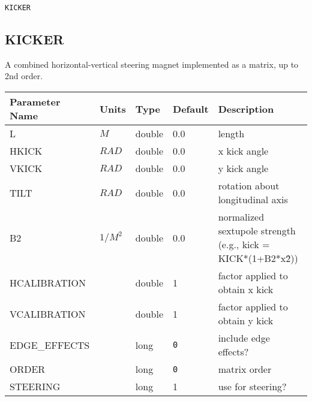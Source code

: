 \begin{latexonly}
\newpage
\begin{center}{\Large\verb|KICKER|}\end{center}
\end{latexonly}\subsection{KICKER}
A combined horizontal-vertical steering magnet implemented as a matrix, up to
2nd order.
\\
\begin{tabular}{|l|l|l|l|p{\descwidth}|} \hline
Parameter Name & Units & Type & Default & Description \\ \hline 
L & $M$ & double &  0.0 & length  \\ \hline 
HKICK & $RAD$ & double &  0.0 & x kick angle  \\ \hline 
VKICK & $RAD$ & double &  0.0 & y kick angle  \\ \hline 
TILT & $RAD$ & double &  0.0 & rotation about longitudinal axis  \\ \hline 
B2 & $1/M^{2}$ & double &  0.0 & normalized sextupole strength (e.g., kick = KICK*(1+B2*x\^2))  \\ \hline 
HCALIBRATION &  & double &   1 & factor applied to obtain x kick  \\ \hline 
VCALIBRATION &  & double &   1 & factor applied to obtain y kick  \\ \hline 
EDGE\_EFFECTS &  & long &  \verb|0| & include edge effects?  \\ \hline 
ORDER &  & long &  \verb|0| & matrix order  \\ \hline 
STEERING &  & long &   1               & use for steering?  \\ \hline 
\end{tabular}

